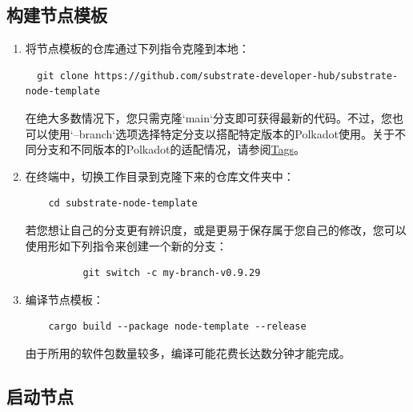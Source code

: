 \subsection{构建节点模板}

\begin{enumerate}
  \item 将节点模板的仓库通过下列指令克隆到本地：
        \begin{lstlisting}
  git clone https://github.com/substrate-developer-hub/substrate-node-template
  \end{lstlisting}

        在绝大多数情况下，您只需克隆`main`分支即可获得最新的代码。不过，您也可以使用`--branch`选项选择特定分支以搭配特定版本的Polkadot使用。关于不同分支和不同版本的Polkadot的适配情况，请参阅\href{https://github.com/substrate-developer-hub/substrate-node-template/tags}{Tags}。

  \item 在终端中，切换工作目录到克隆下来的仓库文件夹中：
        \begin{lstlisting}
    cd substrate-node-template
  \end{lstlisting}
        若您想让自己的分支更有辨识度，或是更易于保存属于您自己的修改，您可以使用形如下列指令来创建一个新的分支：
        \begin{lstlisting}
          git switch -c my-branch-v0.9.29
        \end{lstlisting}
  \item 编译节点模板：
        \begin{lstlisting}
    cargo build --package node-template --release
  \end{lstlisting}
        由于所用的软件包数量较多，编译可能花费长达数分钟才能完成。
\end{enumerate}

\subsection{启动节点}

